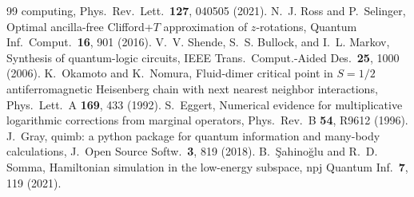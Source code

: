 \documentclass[aps,pra,twocolumn,superscriptaddress,nofootinbib]{revtex4-2}
\begin{document}
\begin{thebibliography}{99}
  computing, Phys.\ Rev.\ Lett.\ \textbf{127}, 040505 (2021).
 N.~J. Ross and P.~Selinger, Optimal ancilla-free Clifford+$T$ approximation of
  $z$-rotations, Quantum Inf.\ Comput.\ \textbf{16}, 901 (2016).
 V.~V. Shende, S.~S. Bullock, and I.~L. Markov, Synthesis of quantum-logic circuits,
  IEEE Trans.\ Comput.-Aided Des.\ \textbf{25}, 1000 (2006).
 K.~Okamoto and K.~Nomura, Fluid-dimer critical point in $S=1/2$ antiferromagnetic
  Heisenberg chain with next nearest neighbor interactions, Phys.\ Lett.\ A \textbf{169}, 433 (1992).
 S.~Eggert, Numerical evidence for multiplicative logarithmic corrections from
  marginal operators, Phys.\ Rev.\ B \textbf{54}, R9612 (1996).
 J.~Gray, quimb: a python package for quantum information and many-body calculations,
  J.\ Open Source Softw.\ \textbf{3}, 819 (2018).
 B.~\c{S}ahino\u{g}lu and R.~D. Somma, Hamiltonian simulation in the low-energy
  subspace, npj Quantum Inf.\ \textbf{7}, 119 (2021).
\end{thebibliography}
\end{document}
